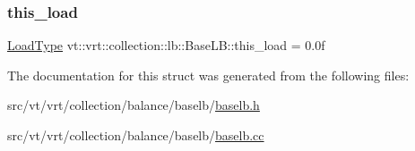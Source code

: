 \mbox{\label{structvt_1_1vrt_1_1collection_1_1lb_1_1_base_l_b_ab7df874591552c346fc77858983fbbec}} 
\subsubsection{\texorpdfstring{this\+\_\+load}{this\_load}}
{\footnotesize\ttfamily \hyperlink{structvt_1_1vrt_1_1collection_1_1lb_1_1_base_l_b_a215e22b9f12678303f49615ae3be05cc}{Load\+Type} vt\+::vrt\+::collection\+::lb\+::\+Base\+L\+B\+::this\+\_\+load = 0.\+0f\hspace{0.3cm}{\ttfamily [protected]}}



The documentation for this struct was generated from the following files\+:\begin{DoxyCompactItemize}
\item 
src/vt/vrt/collection/balance/baselb/\hyperlink{baselb_8h}{baselb.\+h}\item 
src/vt/vrt/collection/balance/baselb/\hyperlink{baselb_8cc}{baselb.\+cc}\end{DoxyCompactItemize}
